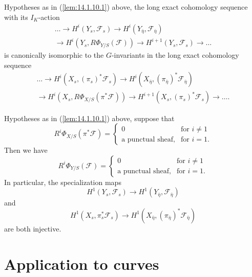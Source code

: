 \begin{kcor}\label{cor:14.1.11}
Hypotheses as in (\ref{lem:14.1.10.1}) above, the long exact cohomology sequence with its $I_K$-action
\begin{multline*}
\dots \to H^i(Y_s, \mathcal{F}_s) \to H^i(Y_{\bar{\eta}}, \mathcal{F}_{\bar{\eta}}) \\
\to H^i(Y_s, R\Phi_{Y/S}(\mathcal{F})) \to H^{i+1}(Y_s, \mathcal{F}_s) \to \dots
\end{multline*}
is canonically isomorphic to the $G$-invariants in the long exact cohomology sequence
\begin{multline*}
\dots \to H^i(X_s, (\pi_s)^*\mathcal{F}_s) \to H^i(X_{\bar{\eta}}, (\pi_{\bar{\eta}})^*\mathcal{F}_{\bar{\eta}}) \\
\to H^i(X_s, R\Phi_{X/S}(\pi^*\mathcal{F})) \to H^{i+1}(X_s, (\pi_s)^*\mathcal{F}_s) \to \dots .
\end{multline*}
\end{kcor}

\begin{kcor}\label{cor:14.1.12}
Hypotheses as in (\ref{lem:14.1.10.1}) above, suppose that
\[
R^i \Phi_{X/S}(\pi^*\mathcal{F}) = \begin{cases}
0 & \text{for } i \neq 1 \\
\text{a punctual sheaf,} & \text{for } i = 1 .
\end{cases}
\]
Then we have
\[
R^i \Phi_{Y/S}(\mathcal{F}) = \begin{cases}
0 & \text{for } i \neq 1 \\
\text{a punctual sheaf,} & \text{for } i = 1 .
\end{cases}
\]
In particular, the specialization maps
\[
H^1(Y_s, \mathcal{F}_s) \to H^1(Y_{\bar{\eta}}, \mathcal{F}_{\bar{\eta}})
\]
and
\[
H^1(X_s, \pi_s^*\mathcal{F}_s) \to H^1(X_{\bar{\eta}}, (\pi_{\bar{\eta}})^*\mathcal{F}_{\bar{\eta}})
\]
are both injective.
\end{kcor}

\section{Application to curves}
\label{sec:14.2}

